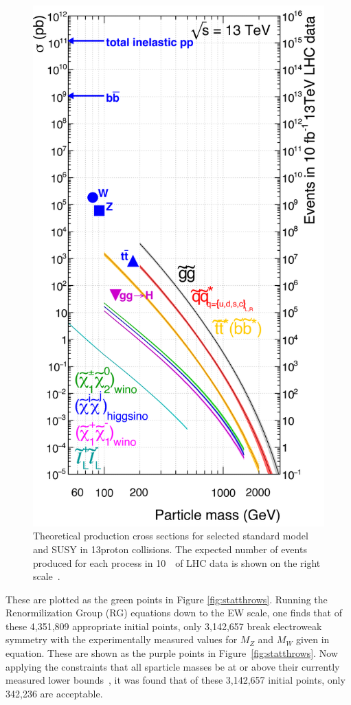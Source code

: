 \begin{figure}
    \centering
    \includegraphics[height=1.25\textwidth]{figs/rpvthreel/xsec10_13_SM.png}
    \caption[Theoretical production cross sections for selected standard model and SUSY in 13\TeV proton collisions. 
    The expected number of events produced for each process in 10~\ifb\ of LHC data is shown on the right scale]{Theoretical production cross sections for selected standard model and SUSY in 13\TeV proton collisions. 
    The expected number of events produced for each process in 10~\ifb\ of LHC data is shown on the right scale~\cite{Borschensky:2014cia}.}
    \label{fig:xsec}
\end{figure}
These are plotted as the green points in Figure \ref{fig:statthrows}.
Running the Renormilization Group (RG) equations down to the EW scale, one finds that of these 4,351,809 appropriate \BL initial points, only 3,142,657 break electroweak symmetry with the experimentally measured values for $M_{Z}$ and $M_{W}$ given in equation.
These are shown as the purple points in Figure~\ref{fig:statthrows}.
Now applying the constraints that all sparticle masses be at or above their currently measured lower bounds~\cite{Dumitru:2018jyb}, it was found that of these 3,142,657 initial points, only 342,236 are acceptable.
